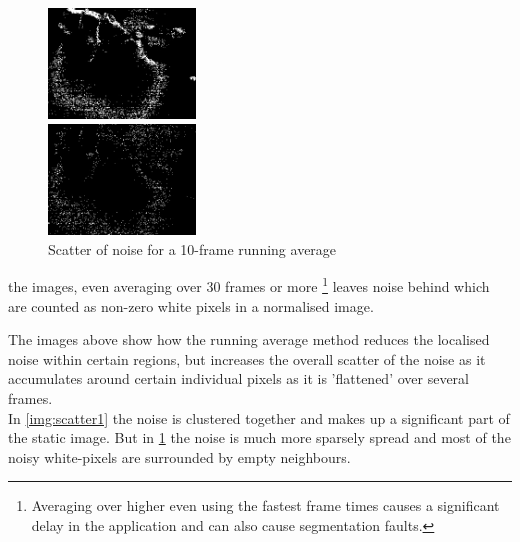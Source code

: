 \begin{figure}
	\vspace{-40pt}
	\begin{center}
		\includegraphics[width=0.35\textwidth]{../images/scatter1}
	\end{center}
	\vspace{-30pt}
	\caption{Scatter of noise for a 1-frame running average}\label{img:scatter1}
	\vspace{10pt}
	\begin{center}
		\includegraphics[width=0.35\textwidth]{../images/scatter2}
	\end{center}
	\vspace{-20pt}
	\caption{Scatter of noise for a 10-frame running average}\label{img:scatter2}
	\vspace{-20pt}
\end{figure}

the images, even averaging over 30 frames or more \footnote{Averaging over higher even using the fastest frame times causes a significant delay in the application and can also cause segmentation faults.}
leaves noise behind which are counted as non-zero white pixels in a normalised image.

The images above show how the running average method reduces the localised noise within certain regions, but increases the overall scatter of the noise as it accumulates around certain individual pixels as it is 'flattened' over several frames.\\\linebreak
\pagebreak In \cref{img:scatter1} the noise is clustered together and makes up a significant part of the static image. But in \cref{img:scatter2} the noise is much more sparsely spread and most of the noisy white-pixels are surrounded by empty neighbours.\\

